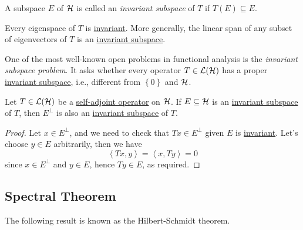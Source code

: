\begin{definition}\label{def:invariant-subspace}
	A subspace \(E\) of \(\mathcal{\MakeUppercase{h}} \) is called an \emph{invariant subspace} of \(T\) if \(T(E) \subseteq E\).
\end{definition}

\begin{eg}
	Every eigenspace of \(T\) is \hyperref[def:invariant-subspace]{invariant}. More generally, the linear span of any subset of eigenvectors of \(T\) is an \hyperref[def:invariant-subspace]{invariant subspace}.
\end{eg}

One of the most well-known open problems in functional analysis is the \emph{invariant subspace problem}. It asks whether every operator \(T\in \mathcal{\MakeUppercase{l}} (\mathcal{\MakeUppercase{h}} )\) has a proper \hyperref[def:invariant-subspace]{invariant subspace}, i.e., different from \(\left\{ 0 \right\} \) and \(\mathcal{\MakeUppercase{h}} \).

\begin{proposition}
	Let \(T\in \mathcal{\MakeUppercase{l}} (\mathcal{\MakeUppercase{h}} )\) be a \hyperref[def:self-adjoint-op]{self-adjoint operator} on \(\mathcal{\MakeUppercase{h}} \). If \(E \subseteq \mathcal{\MakeUppercase{h}} \) is an \hyperref[def:invariant-subspace]{invariant subspace} of \(T\), then \(E^{\perp} \) is also an \hyperref[def:invariant-subspace]{invariant subspace} of \(T\).
\end{proposition}
\begin{proof}
	Let \(x\in E^{\perp} \), and we need to check that \(Tx \in E ^{\perp} \) given \(E\) is \hyperref[def:invariant-subspace]{invariant}. Let's choose \(y\in E\) arbitrarily, then we have
	\[
		\left\langle Tx , y \right\rangle = \left\langle x, Ty \right\rangle = 0
	\]
	since \(x\in E^{\perp} \) and \(y\in E\), hence \(Ty\in E\), as required.
\end{proof}

\subsection{Spectral Theorem}
The following result is known as the Hilbert-Schmidt theorem.

